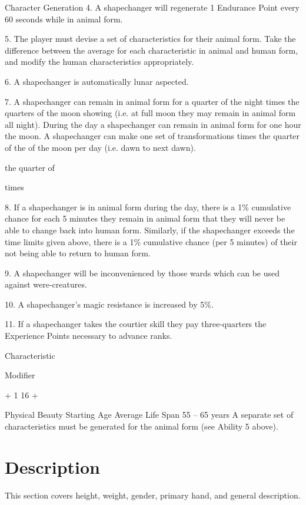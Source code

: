 \begin{Chapter}{Character Generation}
4.  A  shapechanger  will  regenerate  1  Endurance 
Point every 60 seconds while in animal form. 

5.  The  player  must  devise  a  set  of  characteristics 
for their animal form. Take the difference between 
the  average  for  each  characteristic  in  animal  and 
human form, and modify the human characteristics 
appropriately. 

6. A shapechanger is automatically lunar aspected. 

7. A shapechanger can remain in animal form for a 
quarter of the night times the quarters of the moon 
showing  (i.e.  at  full  moon  they  may  remain  in 
animal  form  all  night).  During 
the  day  a 
shapechanger  can  remain  in  animal  form  for  one 
hour 
the  moon.  A 
shapechanger can make one set of transformations 
times  the  quarter  of  the  of  the  moon  per  day  (i.e. 
dawn to next dawn). 

the  quarter  of 

times 

8.  If  a  shapechanger  is  in  animal  form  during  the 
day,  there  is  a  1\%  cumulative  chance  for  each  5 
minutes  they  remain  in  animal  form that  they  will 
never  be  able  to  change  back  into  human  form. 
Similarly,  if  the  shapechanger  exceeds  the  time 
limits  given  above,  there  is  a  1\%  cumulative 
chance  (per  5  minutes)  of  their  not  being  able  to 
return to human form. 

9. A shapechanger will be inconvenienced by those 
wards which can be used against were-creatures. 

10. A shapechanger’s magic resistance is increased 
by 5\%. 

11.  If  a  shapechanger  takes  the  courtier  skill  they 
pay three-quarters the Experience Points necessary 
to advance ranks. 

Characteristic  

Modifier 

+ 1 
16 +  

Physical Beauty  
Starting Age  
Average Life Span   55 – 65 years 
A separate set of characteristics must be generated 
for the animal form (see Ability 5 above). 

\section{Description}

This section covers height, weight, gender, primary hand, and general
description.


\end{Chapter}
